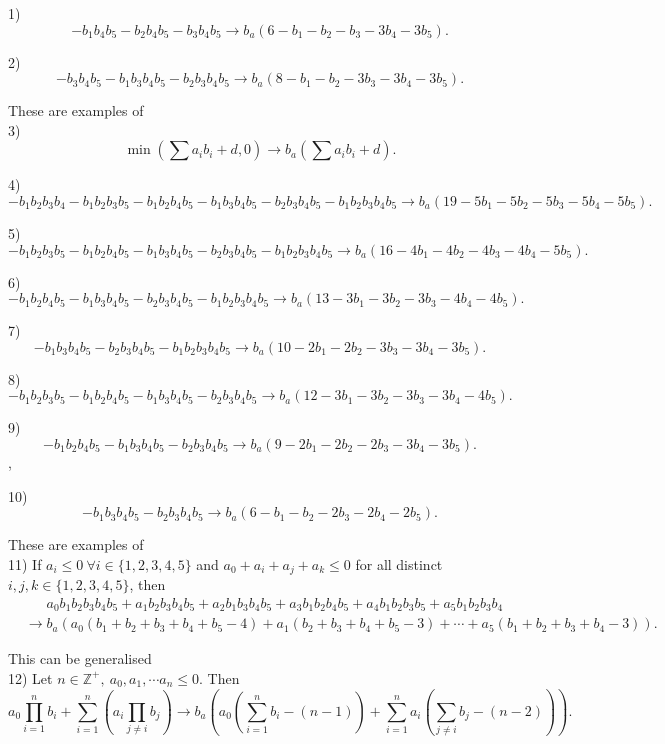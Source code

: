 \documentclass[11pt]{scrartcl}
\begin{document}
\author{} 
\date{SEP 2019}

1)\[-b_1 b_4 b_5 - b_2 b_4 b_5 -b_3 b_4 b_5 \longrightarrow  b_a(6 -b_1 -b_2 -b_3 -3b_4 -3b_5). \]

2)\[-b_3 b_4 b_5 - b_1 b_3 b_4 b_5 - b_2 b_3 b_4 b_5 \longrightarrow b_a(8-b_1 - b_2 - 3b_3 -3b_4 -3b_5). \]

These are examples of \\
3) \[\min \left ( \sum a_i b_i + d, 0\right) \longrightarrow b_a\left(\sum a_i b_i + d \right). \] 

4)\[ -b_1 b_2 b_3 b_4-b_1b_2b_3b_5-b_1b_2b_4b_5-b_1b_3b_4b_5-b_2b_3b_4b_5-b_1b_2b_3b_4b_5
\longrightarrow b_a(19-5b_1 -5b_2 -5b_3 -5b_4 -5b_5).\]

5)\[-b_1b_2b_3b_5-b_1b_2b_4b_5-b_1b_3b_4b_5-b_2b_3b_4b_5-b_1b_2b_3b_4b_5
\longrightarrow b_a(16-4b_1 -4b_2 -4b_3 -4b_4 -5b_5).\]

6)
\[-b_1b_2b_4b_5-b_1b_3b_4b_5-b_2b_3b_4b_5-b_1b_2b_3b_4b_5
\longrightarrow b_a(13 -3b_1-3b_2-3b_3-4b_4-4b_5).\]

7)
\[-b_1b_3b_4b_5-b_2b_3b_4b_5-b_1b_2b_3b_4b_5
\longrightarrow b_a(10-2b_1-2b_2-3b_3-3b_4-3b_5).\]

8)
\[-b_1b_2b_3b_5-b_1b_2b_4b_5-b_1b_3b_4b_5-b_2b_3b_4b_5
\longrightarrow b_a(12-3b_1-3b_2-3b_3-3b_4-4b_5).\]

9)
\[-b_1b_2b_4b_5-b_1b_3b_4b_5-b_2b_3b_4b_5
\longrightarrow b_a(9-2b_1-2b_2-2b_3-3b_4-3b_5).\],

10)
\[-b_1b_3b_4b_5-b_2b_3b_4b_5
\longrightarrow b_a(6-b_1-b_2-2b_3-2b_4-2b_5).\]

These are examples of\\ 
11) If $a_i \le 0 \ \forall i\in \{1, 2, 3, 4, 5\}$ and $a_0 + a_i + a_j +a_k\le 0 $ for all distinct $i, j, k \in \{1, 2, 3, 4, 5\}$, then 
\begin{align*}
	&\phantom{\longrightarrow} a_0 b_1b_2b_3b_4b_5+ a_1b_2b_3b_4b_5+a_2b_1b_3b_4b_5+a_3b_1b_2b_4b_5+a_4b_1b_2b_3b_5+a_5b_1b_2b_3b_4 \\
	&\longrightarrow b_a\left(a_0(b_1+b_2+b_3+b_4+b_5-4)+a_1(b_2+b_3+b_4+b_5 - 3) + \cdots + a_5(b_1+b_2+b_3+b_4 - 3)\right).
\end{align*}

This can be generalised \\
12) Let $n \in \mathbb{Z}^+,\ a_0, a_1, \cdots a_n \le 0$. Then \[ a_0 \prod_{i = 1}^n b_i + \sum_{i = 1}^n \left( a_i \prod_{j \neq i} b_j\right) \longrightarrow  b_a \left(a_0\left(\sum_{i=1}^n b_i - (n-1)\right) + \sum_{i=1}^n a_i \left( \sum_{j \neq i} b_j - (n-2)\right) \right). \]
\end{document}
